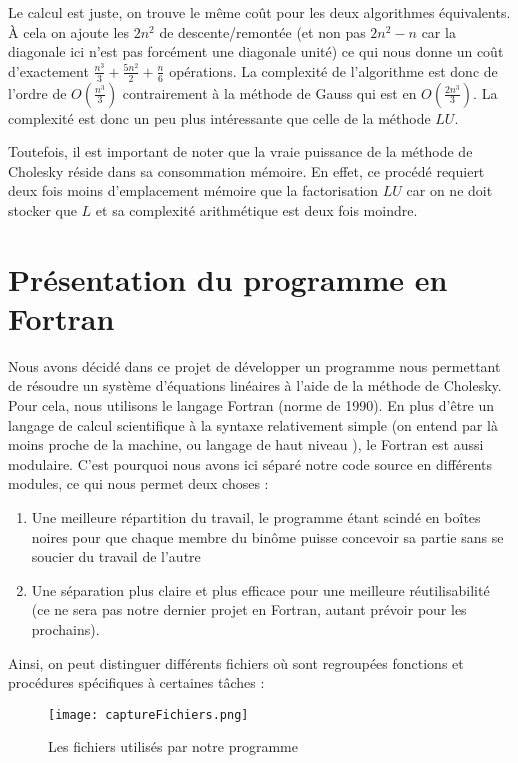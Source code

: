 \documentclass[a4paper, titlepage]{livret}													%
\begin{document}
			Le calcul est juste, on trouve le même coût pour les deux algorithmes équivalents.
			À cela on ajoute les $2n^{2}$ de descente/remontée (et non pas $2n^{2} - n$ car la diagonale ici n'est pas forcément une diagonale unité) ce qui nous donne un coût d'exactement $\frac{n^{3}}{3} + \frac{5n^{2}}{2} + \frac{n}{6}$ opérations.
			La complexité de l'algorithme est donc de l'ordre de $O(\frac{n^{3}}{3})$ contrairement à la méthode de Gauss qui est en $O(\frac{2n^{3}}{3})$. La complexité est donc un peu plus intéressante que celle de la méthode $LU$.

			Toutefois, il est important de noter que la vraie puissance de la méthode de Cholesky réside dans sa consommation mémoire. En effet, ce procédé requiert deux fois moins d'emplacement mémoire que la factorisation $LU$ car on ne doit stocker que $L$ et sa complexité arithmétique est deux fois moindre.

	\section{Présentation du programme en Fortran}
		Nous avons décidé dans ce projet de développer un programme nous permettant de résoudre un système d'équations linéaires à l'aide de la méthode de Cholesky.
		Pour cela, nous utilisons le langage Fortran (norme de 1990).
		En plus d'être un langage de calcul scientifique à la syntaxe relativement simple (on entend par là moins proche de la machine, ou \og langage de haut niveau \fg{}), le Fortran est aussi modulaire.
		C'est pourquoi nous avons ici séparé notre code source en différents modules, ce qui nous permet deux choses :
		\begin{enumerate}
			\item Une meilleure répartition du travail, le programme étant scindé en \og boîtes noires \fg{} pour que chaque membre du binôme puisse concevoir sa partie sans se soucier du travail de l'autre
			\item Une séparation plus claire et plus efficace pour une meilleure réutilisabilité (ce ne sera pas notre dernier projet en Fortran, autant prévoir pour les prochains).
		\end{enumerate}

		Ainsi, on peut distinguer différents fichiers où sont regroupées fonctions et procédures spécifiques à certaines tâches :

		\begin{figure}[!ht]
			\centering
  				\texttt{[image: captureFichiers.png]}
  				\caption{Les fichiers utilisés par notre programme}
		\end{figure}
\end{document}
